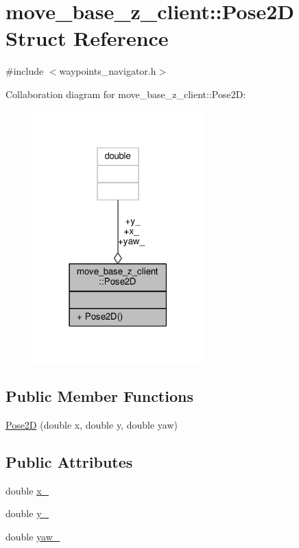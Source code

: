\hypertarget{structmove__base__z__client_1_1Pose2D}{}\section{move\+\_\+base\+\_\+z\+\_\+client\+:\+:Pose2D Struct Reference}
\label{structmove__base__z__client_1_1Pose2D}


{\ttfamily \#include $<$waypoints\+\_\+navigator.\+h$>$}



Collaboration diagram for move\+\_\+base\+\_\+z\+\_\+client\+:\+:Pose2D\+:\nopagebreak
\begin{figure}[H]
\begin{center}
\leavevmode
\includegraphics[width=186pt]{structmove__base__z__client_1_1Pose2D__coll__graph}
\end{center}
\end{figure}
\subsection*{Public Member Functions}
\begin{DoxyCompactItemize}
\item 
\hyperlink{structmove__base__z__client_1_1Pose2D_a97f60b5516b80f09472f178afd07b7ab}{Pose2D} (double x, double y, double yaw)
\end{DoxyCompactItemize}
\subsection*{Public Attributes}
\begin{DoxyCompactItemize}
\item 
double \hyperlink{structmove__base__z__client_1_1Pose2D_a92b53110c2fdd77c18275d6e16709581}{x\+\_\+}
\item 
double \hyperlink{structmove__base__z__client_1_1Pose2D_a10e59f372c758bffb00bfaaca43ec1fc}{y\+\_\+}
\item 
double \hyperlink{structmove__base__z__client_1_1Pose2D_a75fda2f20515d0acdb83d33017e6c97e}{yaw\+\_\+}
\end{DoxyCompactItemize}


